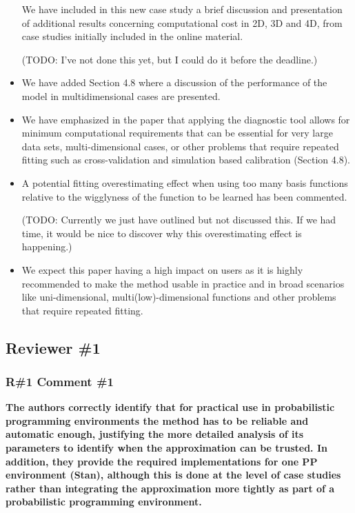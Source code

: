 \documentclass[11pt]{report}
\begin{document}
\begin{itemize}
We have included in this new case study a brief discussion and presentation of additional results concerning computational cost in 2D, 3D and 4D, from case studies initially included in the online material.

{\color{red} (TODO: I've not done this yet, but I could do it before the deadline.)}

\item We have added Section 4.8 where a discussion of the performance of the model in multidimensional cases are presented. 

\item We have emphasized in the paper that applying the diagnostic tool allows for minimum computational requirements that can be essential for very large data sets, multi-dimensional cases, or other problems that require repeated fitting such as cross-validation and simulation based calibration (Section 4.8).

\item A potential fitting overestimating effect when using too many basis functions relative to the wigglyness of the function to be learned has been commented. {\color{red} 

(TODO: Currently we just have outlined but not discussed this. If we had time, it would be nice to discover why this overestimating effect is happening.)}

\item We expect this paper having a high impact on users as it is highly recommended to make the method usable in practice and in broad scenarios like uni-dimensional, multi(low)-dimensional functions and other problems that require repeated fitting.

\end{itemize}

\noindent \hdashrule{12.5cm}{0.2pt}{2mm 1pt}

\subsection*{Reviewer \#1}


\subsubsection*{R\#1 Comment \#1}

\textbf{The authors correctly identify that for practical use in probabilistic programming environments the method has to be reliable and automatic enough, justifying the more detailed analysis of its parameters to identify when the approximation can be trusted. In addition, they provide the required implementations for one PP environment (Stan), although this is done at the level of case studies rather than integrating the approximation more tightly as part of a probabilistic programming environment.}
\end{document}
